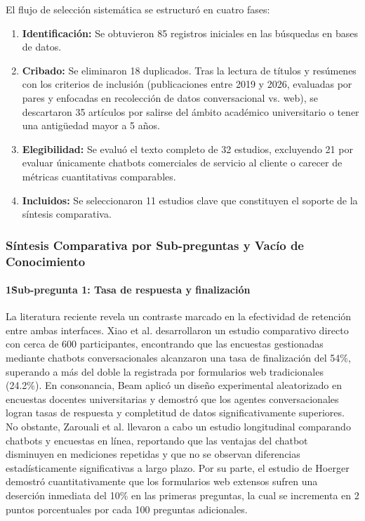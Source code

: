 \documentclass[12pt,letterpaper]{article}
\begin{document}
El flujo de selección sistemática se estructuró en cuatro fases:
\begin{enumerate}
    \item \textbf{Identificación:} Se obtuvieron 85 registros iniciales en las búsquedas en bases de datos.
    \item \textbf{Cribado:} Se eliminaron 18 duplicados. Tras la lectura de títulos y resúmenes con los criterios de inclusión (publicaciones entre 2019 y 2026, evaluadas por pares y enfocadas en recolección de datos conversacional vs. web), se descartaron 35 artículos por salirse del ámbito académico universitario o tener una antigüedad mayor a 5 años.
    \item \textbf{Elegibilidad:} Se evaluó el texto completo de 32 estudios, excluyendo 21 por evaluar únicamente chatbots comerciales de servicio al cliente o carecer de métricas cuantitativas comparables.
    \item \textbf{Incluidos:} Se seleccionaron 11 estudios clave que constituyen el soporte de la síntesis comparativa.
\end{enumerate}
 
\subsubsection{Síntesis Comparativa por Sub-preguntas y Vacío de Conocimiento}
 
\paragraph{1\. Sub-pregunta 1: Tasa de respuesta y finalización}
La literatura reciente revela un contraste marcado en la efectividad de retención entre ambas interfaces. Xiao et al. \cite{xiao2020} desarrollaron un estudio comparativo directo con cerca de 600 participantes, encontrando que las encuestas gestionadas mediante chatbots conversacionales alcanzaron una tasa de finalización del 54\%, superando a más del doble la registrada por formularios web tradicionales (24.2\%). En consonancia, Beam \cite{beam2023} aplicó un diseño experimental aleatorizado en encuestas docentes universitarias y demostró que los agentes conversacionales logran tasas de respuesta y completitud de datos significativamente superiores. No obstante, Zarouali et al. \cite{zarouali2023} llevaron a cabo un estudio longitudinal comparando chatbots y encuestas en línea, reportando que las ventajas del chatbot disminuyen en mediciones repetidas y que no se observan diferencias estadísticamente significativas a largo plazo. Por su parte, el estudio de Hoerger \cite{hoerger2010} demostró cuantitativamente que los formularios web extensos sufren una deserción inmediata del 10\% en las primeras preguntas, la cual se incrementa en 2 puntos porcentuales por cada 100 preguntas adicionales.
 
\end{document}
